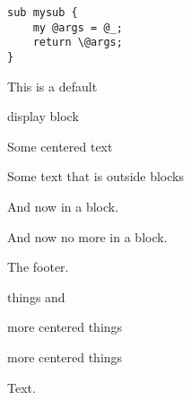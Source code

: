 \begin{verbatim}
sub mysub {
    my @args = @_;
    return \@args;
}
\end{verbatim}
This is a default

display block

\begin{center}
Some centered text
\end{center}

Some text that is outside blocks

And now in a block.

And now no more in a block.

The footer.

things and
\begin{center}
more centered things
\end{center}

\begin{center}
more centered things
\end{center}
Text.


